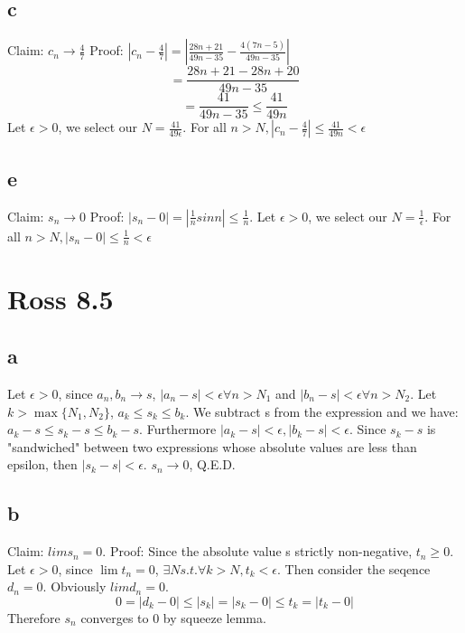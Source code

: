 \documentclass[12pt]{article}
\begin{document}
\subsection{c}
Claim: $c_n \to \frac{4}{7}$
\newline
Proof: $|c_n- \frac{4}{7}| = |\frac{28n+21}{49n-35} - \frac{4(7n-5)}{49n-35}|$
$$= \frac{28n+21-28n+20}{49n-35}$$
$$= \frac{41}{49n-35} \leq \frac{41}{49n}$$
\newline
Let  $\epsilon > 0$, we select our $N = \frac{41}{49\epsilon}$. For all $n>N, |c_n- \frac{4}{7}| \leq \frac{41}{49n} < \epsilon$

\subsection{e}
Claim: $s_n \to 0$
\newline
Proof: $|s_n - 0| = |\frac{1}{n}sin n| \leq \frac{1}{n}$.
\newline
Let  $\epsilon > 0$, we select our $N = \frac{1}{\epsilon}$. For all $n>N, |s_n-0| \leq \frac{1}{n} < \epsilon$
\newpage


\section{Ross 8.5}
\subsection{a}
Let $\epsilon > 0$, since $a_n, b_n \to s$, $|a_n-s|<\epsilon \forall n > N_1$ and $|b_n-s|<\epsilon \forall n > N_2$.
\newline
Let $k> \max \{ N_1, N_2\}$, $a_k \leq s_k \leq b_k$. We subtract s from the expression and we have: $a_k-s \leq s_k -s \leq b_k-s$. Furthermore $|a_k-s|<\epsilon, |b_k - s| < \epsilon$.
\newline
Since $s_k-s$ is "sandwiched" between two expressions whose absolute values are less than epsilon, then $|s_k-s|<\epsilon$.
\newline
$s_n \to 0$, Q.E.D.

\subsection{b}
Claim: $lim s_n = 0$.
\newline
Proof:
Since the absolute value s strictly non-negative, $t_n \geq 0$. Let $\epsilon>0$, since $\lim t_n = 0$, $\exists N s.t. \forall k> N, t_k < \epsilon$. Then consider the seqence $d_n = 0$. Obviously $lim d_n = 0$.
\newline
$$0 = |d_k-0| \leq |s_k| = |s_k - 0| \leq t_k = |t_k - 0|$$
Therefore $s_n$ converges to 0 by squeeze lemma.
\newpage
\end{document}
